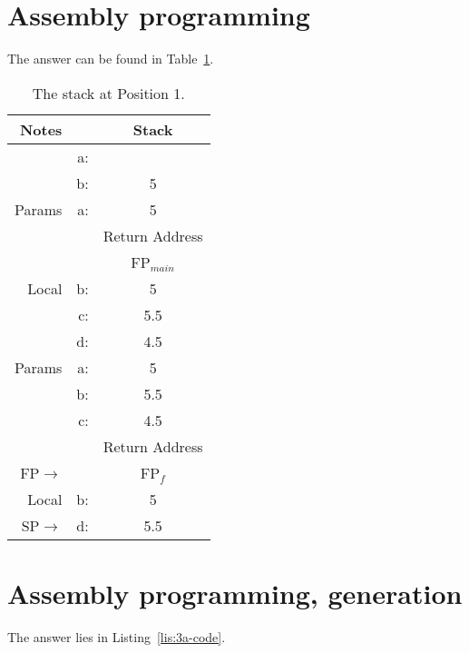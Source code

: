 \section{Assembly programming}
The answer can be found in Table~\ref{tab:2a}.
\begin{table}[H]
\centering
\begin{tabular}{|r|r||c|}
	\hline
	Notes	& & Stack \\ \hline
			& a: & 		\\ \hline		
			& b: & 5	\\ \hline
	Params	& a: & 5	\\ \hline	
			& &Return Address  \\ \hline
			& &FP$_{main}$ \\ \hline
	Local	& b: & 5	\\ \hline
			& c: & 5.5	\\ \hline
			& d: & 4.5	\\ \hline
	Params	& a: & 5	\\ \hline
			& b: & 5.5	\\ \hline
			& c: & 4.5	\\ \hline
			& &Return Address \\ \hline
	FP$\rightarrow$& &FP$_f$ 	\\ \hline
	Local	& b: & 5	\\ \hline
	SP$\rightarrow$	& d: & 5.5	\\ \hline
\end{tabular}
\caption{The stack at Position 1.}
\label{tab:2a}
\end{table}


\newpage
\section{Assembly programming, generation}
The answer lies in Listing~\ref{lis:3a-code}.

